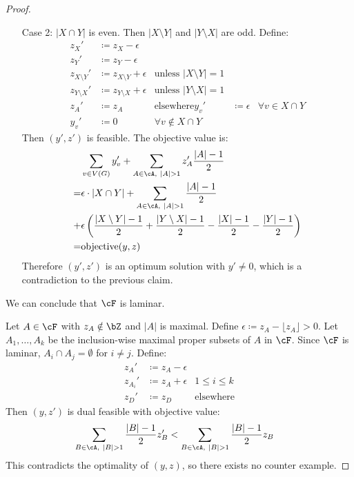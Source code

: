 \documentclass[11pt, a4paper]{article}
\newcommand{\floor}[1]{\lfloor #1 \rfloor}
\newcommand{\abs}[1]{\left\lvert#1\right\rvert}
\theoremstyle{remark}
\theoremstyle{definition}
\begin{document}
\begin{proof}
\begin{enumerate}
	\item[Case 2:] $\abs{X\cap Y}$ is even. Then $\abs{X\setminus Y}$ and
	$\abs{Y\setminus X}$ are odd. Define:
	\begin{align*}
		z_X'&\coloneqq z_X-\epsilon \\
		z_Y'&\coloneqq z_Y-\epsilon \\
		z_{X\setminus Y}'&\coloneqq z_{X\setminus Y}+\epsilon
			&\text{unless $\abs{X\setminus Y}=1$} \\
		z_{Y\setminus X}'&\coloneqq z_{Y\setminus X}+\epsilon
			&\text{unless $\abs{Y\setminus X}=1$} \\ 
		z_{A}'&\coloneqq z_A &\text{elsewhere}
		y_v'&\coloneqq \epsilon &\forall v\in X\cap Y \\
		y_v'&\coloneqq 0 &\forall v\notin X\cap Y
	\end{align*}
	Then $(y',z')$ is feasible. The objective value is:
	\begin{align*}
		&\sum_{v\in V(G)}y_v'
			+\sum_{A\in\cA,\ \abs{A}>1}z_A'\frac{\abs{A}-1}{2} \\
		=&\epsilon\cdot\abs{X\cap Y}
			+\sum_{A\in\cA,\ \abs{A}>1}\frac{\abs{A}-1}{2} \\
		+&\epsilon\left(\frac{\abs{X\setminus Y}-1}{2}
			+\frac{\abs{Y\setminus X}-1}{2}-\frac{\abs{X}-1}{2}
			-\frac{\abs{Y}-1}{2}\right) \\
		=&\mathrm{objective}(y,z)
	\end{align*}
	Therefore $(y',z')$ is an optimum solution with $y'\neq0$, which is
	a contradiction to the previous claim.
\end{enumerate}
We can conclude that $\cF$ is laminar.

Let $A\in\cF$ with $z_A\notin\bZ$ and $\abs{A}$ is maximal. Define
$\epsilon\coloneqq z_A-\floor{z_A}>0$. Let $A_1,\ldots,A_k$ be the
inclusion-wise maximal proper subsets of $A$ in $\cF$. Since $\cF$ is
laminar, $A_i\cap A_j=\emptyset$ for $i\neq j$. Define:
\begin{align*}
	z_A'&\coloneqq z_A-\epsilon \\
	z_{A_i}'&\coloneqq z_A+\epsilon &1\leq i\leq k \\
	z_D'&\coloneqq z_D &\text{elsewhere}
\end{align*}
Then $(y,z')$ is dual feasible with objective value:
\begin{align*}
	\sum_{B\in\cA,\ \abs{B}>1}\frac{\abs{B}-1}{2}z_B'
	&<\sum_{B\in\cA,\ \abs{B}>1}\frac{\abs{B}-1}{2}z_B
\end{align*}
This contradicts the optimality of $(y,z)$, so there exists no counter
example.
\end{proof}
\end{document}

